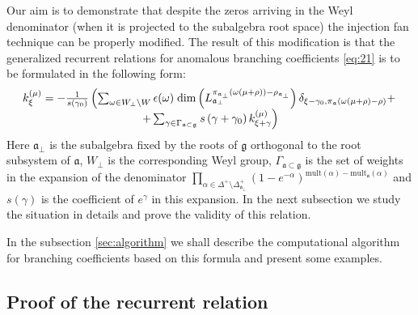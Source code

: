 \documentclass[a4paper,12pt]{article}
\theoremstyle{definition} \newtheorem{Def}{Definition}
\begin{document}
Our aim is to demonstrate that despite the zeros arriving in the Weyl denominator
(when it is projected to the subalgebra root space) the injection fan technique can be properly modified.
The result of this modification is that the generalized recurrent relations for anomalous branching
coefficients \eqref{eq:21} is to be formulated in the following form:
\begin{equation}
  \label{eq:1}
  \begin{array}{c}
      k_{\xi }^{\left( \mu \right) }=-\frac{1}{s\left( \gamma _{0}\right) }\left(
  \sum_{\omega\in W_{\bot}\backslash W} \epsilon(\omega)\; {\rm dim}\left(L^{\pi_{\mathfrak{a}_{\bot}}(\omega(\mu+\rho))-\rho_{\mathfrak{a}_{\bot}}}_{\mathfrak{a}_{\bot}}\right) \delta_{\xi-\gamma_0,\pi_{\mathfrak{a}}(\omega(\mu+\rho)-\rho)}+ \right.\\
\left.
+\sum_{\gamma \in
\Gamma _{\frak{a}\subset \frak{g}}}s\left( \gamma +\gamma _{0}\right) k_{\xi
+\gamma }^{\left( \mu \right) }\right)
  \end{array}
   \end{equation}
Here $\mathfrak{a}_{\bot}$ is the subalgebra fixed by the roots of $\mathfrak{g}$
orthogonal to the root subsystem of $\mathfrak{a}$, $W_{\bot}$ is the corresponding Weyl group,
$\Gamma_{\mathfrak{a}\subset \mathfrak{g}}$ is the set of weights in the expansion
of the denominator $\prod_{\alpha\in \Delta^{+}\setminus \Delta^{+}_{\mathfrak{a}_{\bot}}}
(1-e^{-\alpha})^{\mathrm{mult}(\alpha)-\mathrm{mult}_{\mathfrak{a}}(\alpha)}$ and $s(\gamma)$
is the coefficient of $e^{\gamma}$ in this expansion.
In the next subsection we study the situation in details and prove the validity of this relation.

In the subsection \ref{sec:algorithm} we  shall describe the  computational algorithm for  branching coefficients
based on this formula and present some examples.

\subsection{Proof of the recurrent relation}
\label{sec:proof}
\end{document}
